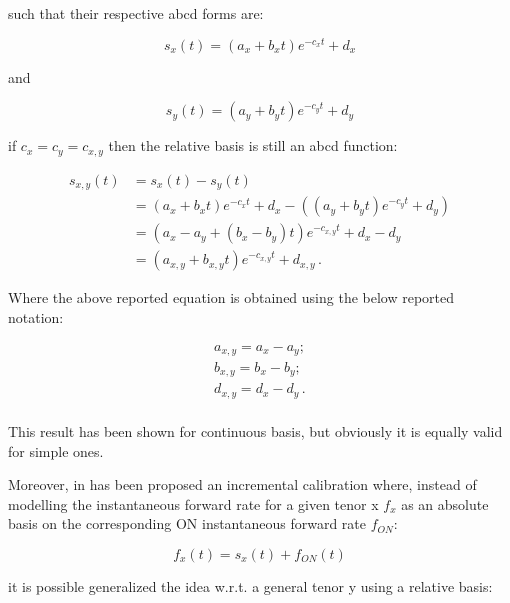 {such that their respective abcd forms are:

\begin{equation*}
s_{x}(t) = (a_{x}+b_{x}t)e^{-c_{x}t}+d_{x}
\end{equation*}

and

\begin{equation*}
s_{y}(t) = (a_{y}+b_{y}t)e^{-c_{y}t}+d_{y}
\end{equation*}

if $c_{x}=c_{y}=c_{x,y}$ then the relative basis is still an abcd function:

\begin{equation}
\begin{split}
s_{x,y}(t)& =s_{x}(t)-s_{y}(t)\\
& =(a_{x}+b_{x}t)e^{-c_{x}t}+d_{x}-((a_{y}+b_{y}t)e^{-c_{y}t}+d_{y})\\
& =(a_{x}-a_{y}+(b_{x}-b_{y})t)e^{-c_{x,y}t}+d_{x}-d_{y}\\
& =(a_{x,y}+b_{x,y}t)e^{-c_{x,y}t}+d_{x,y}\,.
\end{split}
\end{equation}

Where the above reported equation is obtained using the below reported notation:

\begin{equation}
\begin{split}
a_{x,y}=a_{x}-a_{y};\\
b_{x,y}=b_{x}-b_{y} ;\\
d_{x,y}=d_{x}-d_{y} \,.\\
\label{eq:x_y_parameters}
\end{split}
\end{equation}

This result has been shown for continuous basis, but obviously it is equally valid for simple ones.


Moreover, in \cite{ametrano_ballabio_mazzocchi} has been proposed an incremental calibration where, instead of modelling the instantaneous forward rate for a given tenor x $f_{x}$ as an absolute basis on the corresponding ON instantaneous forward rate $f_{ON}$:

\begin{equation}
     f_{x}(t)=s_{x}(t)+f_{ON}(t)
     \label{eq:forward as basis + on}
\end{equation}

it is possible generalized the idea w.r.t. a general tenor y using a relative basis:

}
